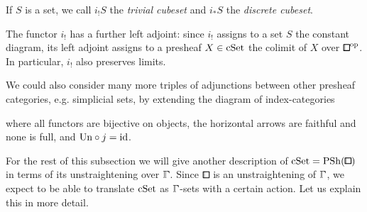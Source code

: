 \begin{definition}
If $S$ is a set, we call $i_! S$ the \emph{trivial cubeset} and $i_* S$ the \emph{discrete cubeset}.
\end{definition}

\begin{remark}\label{rem:left-adjoint-i_!}
The functor $i_!$ has a further left adjoint:
since $i_!$ assigns to a set $S$ the constant diagram,
its left adjoint assigns to a presheaf $X\in\mathrm{cSet}$ the colimit of $X$ over ${\bbox}^\op$.
In particular, $i_!$ also preserves limits.
\end{remark}

\begin{remark}
We could also consider many more triples of adjunctions between other presheaf categories, e.g. simplicial sets, by extending the diagram of index-categories
\begin{center}
\end{center}
where all functors are bijective on objects, the horizontal arrows are faithful and none is full,
and $\mathrm{Un}\circ j = \operatorname{id}$.
\end{remark}

For the rest of this subsection we will give another description of $\cSet = \PSh(\bbox)$ in terms of its unstraightening over $\bbGamma$.
Since $\bbox$ is an unstraightening of $\bbGamma$, we expect to be able to translate $\mathrm{cSet}$ as $\bbGamma$-sets with a certain action.
Let us explain this in more detail.

